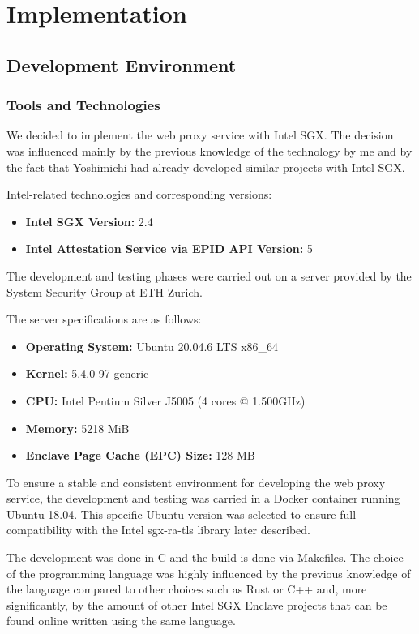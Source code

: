 \chapter{Implementation}\label{ch:sample-chapter}
\section{Development Environment}

\subsection{Tools and Technologies} \label{sec:tools-and-technologies}
We decided to implement the web proxy service with Intel SGX. The decision was influenced mainly by the previous knowledge of the technology by me and by the fact that Yoshimichi had already developed similar projects with Intel SGX. 

Intel-related technologies and corresponding versions:
\begin{itemize}
    \item \textbf{Intel SGX Version:} 2.4
    \item \textbf{Intel Attestation Service via EPID \cite{intelSGXattesationservice} API Version:} 5
\end{itemize}

The development and testing phases were carried out on a server provided by the System Security Group at ETH Zurich.

The server specifications are as follows:
\begin{itemize}
    \item \textbf{Operating System:} Ubuntu 20.04.6 LTS x86\_64
    \item \textbf{Kernel:} 5.4.0-97-generic
    \item \textbf{CPU:} Intel Pentium Silver J5005 (4 cores @ 1.500GHz)
    \item \textbf{Memory:} 5218 MiB
    \item \textbf{Enclave Page Cache (EPC) Size:} 128 MB
\end{itemize}

To ensure a stable and consistent environment for developing the web proxy service, the development and testing was carried in a Docker container running Ubuntu 18.04. This specific Ubuntu version was selected to ensure full compatibility with the Intel sgx-ra-tls library later described.

The development was done in C and the build is done via Makefiles. The choice of the programming language was highly influenced by the previous knowledge of the language compared to other choices such as Rust or C++ and, more significantly, by the amount of other Intel SGX Enclave projects that can be found online written using the same language. 

